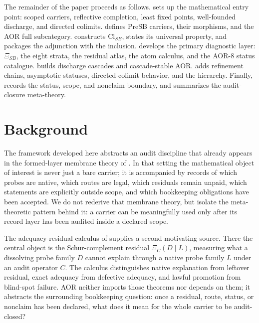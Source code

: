 \documentclass[11pt]{article}
\newcommand{\ClSB}{\mathrm{Cl}_{SB}}
\newcommand{\XiSB}{\Xi_{SB}}
\theoremstyle{definition}
\begin{document}
The remainder of the paper proceeds as follows.  
sets up the mathematical entry point: scoped carriers, reflective
completion, least fixed points, well-founded discharge, and directed
colimits.   defines PreSB carriers, their
morphisms, and the AOR full subcategory.  
constructs \(\ClSB\), states its universal property, and packages the
adjunction with the inclusion.   develops the
primary diagnostic layer: \(\XiSB\), the eight strata, the residual atlas,
the atom calculus, and the AOR-8 status catalogue.  
builds discharge cascades and cascade-stable AOR.  
adds refinement chains, asymptotic statuses, directed-colimit behavior, and
the hierarchy.  Finally,  records the status,
scope, and nonclaim boundary, and  summarizes the
audit-closure meta-theory.
 \section{Background}\label{sec:aor-background}

The framework developed here abstracts an audit discipline that
already appears in the formed-layer membrane theory of
\citet{Tsiokos2026NeedleKiller}.  In that setting the mathematical
object of interest is never just a bare carrier; it is accompanied by
records of which probes are native, which routes are legal, which
residuals remain unpaid, which statements are explicitly outside
scope, and which bookkeeping obligations have been accepted.  We do
not rederive that membrane theory, but isolate the meta-theoretic
pattern behind it: a carrier can be meaningfully used only after its
record layer has been audited inside a declared scope.

The adequacy-residual calculus of \citet{Tsiokos2026XiCompanion}
supplies a second motivating source.  There the central object is the
Schur-complement residual \(\Xi_C(D\mid L)\), measuring what a
dissolving probe family \(D\) cannot explain through a native probe
family \(L\) under an audit operator \(C\).  The calculus distinguishes
native explanation from leftover residual, exact adequacy from
defective adequacy, and lawful promotion from blind-spot failure.
AOR neither imports those theorems nor depends on them; it abstracts
the surrounding bookkeeping question: once a residual, route, status,
or nonclaim has been declared, what does it mean for the whole
carrier to be audit-closed?
\end{document}
